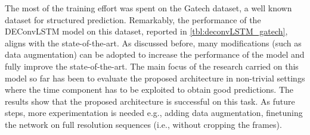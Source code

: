 \begin{table}[t]
    \caption{The results of the experiments on the effects of time correlation
        the CamVid dataset. Pixel accuracy and average Intersection over Union
        (IoU) are reported. The model seems to fail to generalize properly.}
    \label{tbl:deconvLSTM_camvid_overfit}
\end{table}




The most of the training effort was spent on the Gatech dataset, a well known
dataset for structured prediction. Remarkably, the performance of the
DEConvLSTM model on this dataset, reported in \autoref{tbl:deconvLSTM_gatech},
aligns with the state-of-the-art. As discussed before, many modifications (such
as data augmentation) can be adopted to increase the performance of the model
and fully improve the state-of-the-art. The main focus of the research carried
on this model so far has been to evaluate the proposed architecture in
non-trivial settings where the time component has to be exploited to obtain
good predictions. The results show that the proposed architecture is successful
on this task. As future steps, more experimentation is needed e.g., adding data
augmentation, finetuning the network on full resolution sequences (i.e.,
without cropping the frames).

